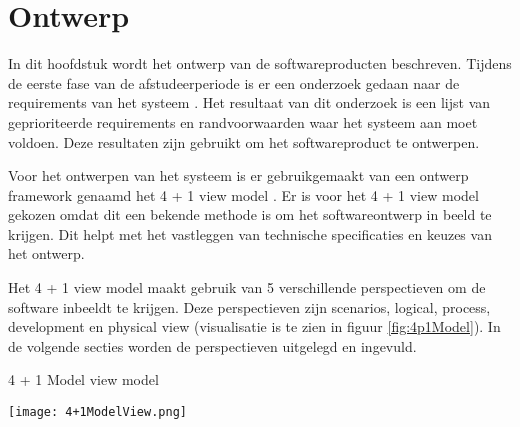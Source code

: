 \chapter{Ontwerp}
In dit hoofdstuk wordt het ontwerp van de softwareproducten beschreven.
Tijdens de eerste fase van de afstudeerperiode is er een onderzoek gedaan naar de requirements van het systeem \parencite{DanteOnderzoek}.
Het resultaat van dit onderzoek is een lijst van geprioriteerde requirements en randvoorwaarden waar het systeem aan moet voldoen.
Deze resultaten zijn gebruikt om het softwareproduct te ontwerpen.

\whitespace
Voor het ontwerpen van het systeem is er gebruikgemaakt van een ontwerp framework genaamd het 4 + 1 view model \parencite{4p1Model}.
Er is voor het 4 + 1 view model gekozen omdat dit een bekende methode is om het softwareontwerp in beeld te krijgen.
Dit helpt met het vastleggen van technische specificaties en keuzes van het ontwerp.

\whitespace
Het 4 + 1 view model maakt gebruik van 5 verschillende perspectieven om de software inbeeldt te krijgen.
Deze perspectieven zijn scenarios, logical, process, development en physical view (visualisatie is te zien in figuur \ref{fig:4p1Model}).
In de volgende secties worden de perspectieven uitgelegd en ingevuld.

\whitespace[2]
\begin{graphic}
	\captionsetup{type=figure}
	\caption{4 + 1 Model view model \parencite{4p1Model} }
	\texttt{[image: 4+1ModelView.png]}
	\label{fig:4p1Model}
\end{graphic}

\newpage

\newpage


\newpage


\newpage

\newpage


